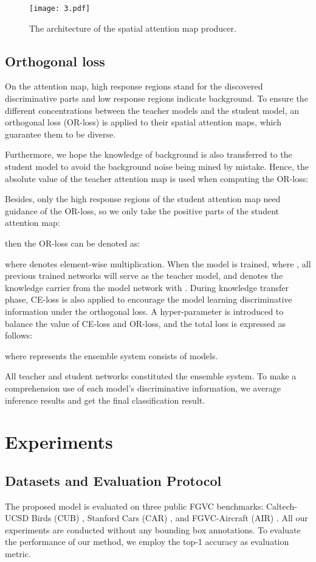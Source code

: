\documentclass{article}
\begin{document}
\begin{figure}[!t]
\centering
\texttt{[image: 3.pdf]}
\caption{The architecture of the spatial attention map producer.}
\label{fig:photo3}
\end{figure}

\subsection{Orthogonal loss} 
On the attention map, high response regions stand for the discovered discriminative parts and low response regions indicate background. To ensure the different concentrations between the teacher models and the student model, an orthogonal loss (OR-loss) is applied to their spatial attention maps, which guarantee them to be diverse. 

Furthermore, we hope the knowledge of background is also transferred to the student model to avoid the background noise being mined by mistake. Hence, the absolute value of the teacher attention map is used when computing the OR-loss:


Besides, only the high response regions of the student attention map need guidance of the OR-loss, so we only take the positive parts of the student attention map:

then the OR-loss can be denoted as:

where  denotes element-wise multiplication. When the  model is trained, where , all previous trained networks will serve as the teacher model, and  denotes the knowledge carrier from the  model network with . During knowledge transfer phase, CE-loss is also applied to encourage the model learning discriminative information under the orthogonal loss. A hyper-parameter  is introduced to balance the value of CE-loss and OR-loss, and the total loss  is expressed as follows:



where  represents the ensemble system consists of  models.

All teacher and student networks constituted the ensemble system. To make a comprehension use of each model's discriminative information, we average inference results and get the final classification result.


\section{Experiments}



\subsection{Datasets and Evaluation Protocol}
The proposed model is evaluated on three public FGVC benchmarks: Caltech-UCSD Birds (CUB) \cite{WahCUB_200_2011}, Stanford Cars (CAR) \cite{krause20133d}, and FGVC-Aircraft (AIR) \cite{DBLP:journals/corr/MajiRKBV13}. All our experiments are conducted without any bounding box annotations. To evaluate the performance of our method, we employ the top-1 accuracy as evaluation metric.
\end{document}
